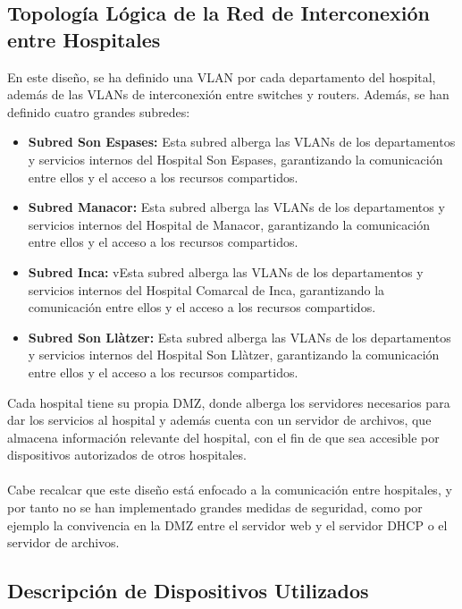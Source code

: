 \subsection{Topología Lógica de la Red de Interconexión entre Hospitales}
En este diseño, se ha definido una VLAN por cada departamento del hospital, además de las VLANs de interconexión entre switches y routers. Además, se han definido cuatro grandes subredes:
\begin{itemize}
    \item \textbf{Subred Son Espases:} Esta subred alberga las VLANs de los departamentos y servicios internos del Hospital Son Espases, garantizando la comunicación entre ellos y el acceso a los recursos compartidos.
    \item \textbf{Subred Manacor:} Esta subred alberga las VLANs de los departamentos y servicios internos del Hospital de Manacor, garantizando la comunicación entre ellos y el acceso a los recursos compartidos.
    \item \textbf{Subred Inca:} vEsta subred alberga las VLANs de los departamentos y servicios internos del Hospital Comarcal de Inca, garantizando la comunicación entre ellos y el acceso a los recursos compartidos.
    \item \textbf{Subred Son Llàtzer:} Esta subred alberga las VLANs de los departamentos y servicios internos del Hospital Son Llàtzer, garantizando la comunicación entre ellos y el acceso a los recursos compartidos.
\end{itemize}
Cada hospital tiene su propia DMZ, donde alberga los servidores necesarios para dar los servicios al hospital y además cuenta con un servidor de archivos, que almacena información relevante del hospital, con el fin de que sea accesible por dispositivos autorizados de otros hospitales.
\\ \\
Cabe recalcar que este diseño está enfocado a la comunicación entre hospitales, y por tanto no se han implementado grandes medidas de seguridad, como por ejemplo la convivencia en la DMZ 
entre el servidor web y el servidor DHCP o el servidor de archivos.
\subsection{Descripción de Dispositivos Utilizados}

